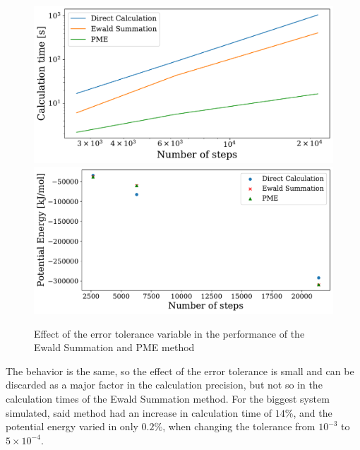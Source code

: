 \documentclass[a4paper, 12pt, notitlepage]{article}
\begin{document}
\begin{figure}
	\centering
	\includegraphics[scale=0.35]{./Figures/plot3.pdf}\hspace{15pt}
	\includegraphics[scale=0.35]{./Figures/plot4.pdf}
	\caption{Effect of the error tolerance variable in the performance of the Ewald Summation and PME method}\label{fig:fig4}
\end{figure}
The behavior is the same, so the effect of the error tolerance is small and can be discarded as a major factor in the calculation precision, but not so in the calculation times of the Ewald Summation method. For the biggest system simulated, said method had an increase in calculation time of $14$\%, and the potential energy varied in only $0.2$\%, when changing the tolerance from $10^{-3}$ to $5\times 10^{-4}$.
\end{document}
